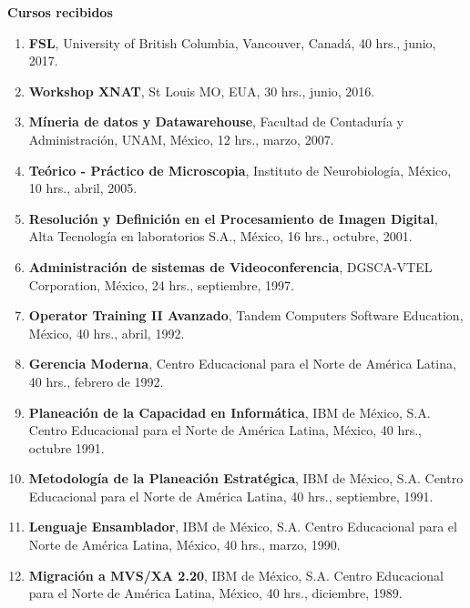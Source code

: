 \textbf{\color{red} Cursos recibidos}

\begin{enumerate}

\item \textbf{FSL}, University of British Columbia, Vancouver, Canadá, 40 hrs., junio, 2017. 

\item \textbf{Workshop XNAT}, St Louis MO, EUA, 30 hrs., junio, 2016. 

\item \textbf{Míneria de datos y Datawarehouse}, Facultad de Contaduría y Administración, UNAM, México, 12 hrs., marzo, 2007.

\item \textbf{Teórico - Práctico de Microscopia}, Instituto de Neurobiología, México, 10 hrs., abril, 2005.

\item \textbf{Resolución y Definición en el Procesamiento de Imagen Digital}, Alta Tecnología en laboratorios S.A., México, 16 hrs., octubre, 2001.

\item \textbf{Administración de sistemas de Videoconferencia}, DGSCA-VTEL Corporation, México, 24 hrs., septiembre, 1997.

\item \textbf{Operator Training II Avanzado}, Tandem Computers Software Education, México, 40 hrs., abril,  1992.

\item \textbf{Gerencia Moderna}, Centro Educacional para el Norte de América Latina, 40 hrs., febrero de 1992.

\item \textbf{Planeación de la Capacidad en Informática}, IBM de México, S.A. Centro Educacional para el Norte de América Latina, México, 40 hrs., 
octubre 1991.

\item \textbf{Metodología de la Planeación Estratégica}, IBM de México, S.A. Centro Educacional para el Norte de América Latina, 40 hrs., septiembre, 1991.
 
\item \textbf{Lenguaje Ensamblador}, IBM de México, S.A. Centro Educacional para el Norte de América Latina, México, 40 hrs., marzo, 1990.
 
\item \textbf{Migración a MVS/XA 2.20}, IBM de México, S.A. Centro Educacional para el Norte de América Latina, México, 40 hrs., diciembre, 1989.


\end{enumerate}
